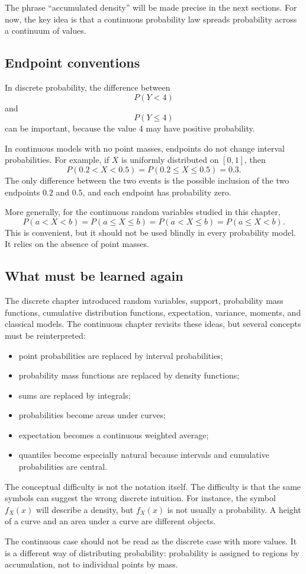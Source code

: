 The phrase ``accumulated density'' will be made precise in the next sections.
For now, the key idea is that a continuous probability law spreads probability
across a continuum of values.

\subsection*{Endpoint conventions}

In discrete probability, the difference between
\[
P(Y<4)
\]
and
\[
P(Y\leq 4)
\]
can be important, because the value \(4\) may have positive probability.

In continuous models with no point masses, endpoints do not change interval
probabilities. For example, if \(X\) is uniformly distributed on \([0,1]\), then
\[
P(0.2<X<0.5)=P(0.2\leq X\leq 0.5)=0.3.
\]
The only difference between the two events is the possible inclusion of the two
endpoints \(0.2\) and \(0.5\), and each endpoint has probability zero.

More generally, for the continuous random variables studied in this chapter,
\[
P(a<X<b)=P(a\leq X\leq b)=P(a<X\leq b)=P(a\leq X<b).
\]
This is convenient, but it should not be used blindly in every probability
model. It relies on the absence of point masses.

\subsection*{What must be learned again}

The discrete chapter introduced random variables, support, probability mass
functions, cumulative distribution functions, expectation, variance, moments, and
classical models. The continuous chapter revisits these ideas, but several
concepts must be reinterpreted:
\begin{itemize}
    \item point probabilities are replaced by interval probabilities;
    \item probability mass functions are replaced by density functions;
    \item sums are replaced by integrals;
    \item probabilities become areas under curves;
    \item expectation becomes a continuous weighted average;
    \item quantiles become especially natural because intervals and cumulative
    probabilities are central.
\end{itemize}

The conceptual difficulty is not the notation itself. The difficulty is that the
same symbols can suggest the wrong discrete intuition. For instance, the symbol
\(f_X(x)\) will describe a density, but \(f_X(x)\) is not usually a probability.
A height of a curve and an area under a curve are different objects.

\begin{theorembox}
The continuous case should not be read as the discrete case with more values.
It is a different way of distributing probability: probability is assigned to
regions by accumulation, not to individual points by mass.
\end{theorembox}
